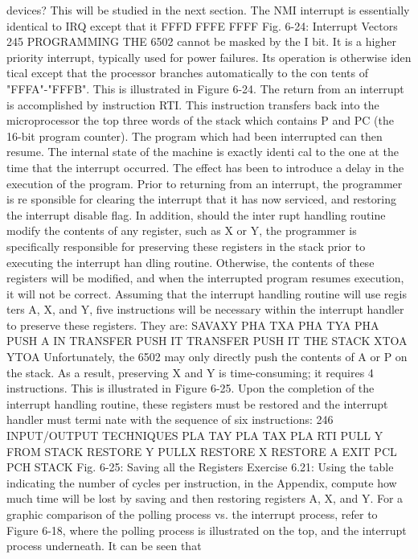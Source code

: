 \documentclass{book}
\begin{document}
devices? This will be studied in the next section.
The NMI interrupt is essentially identical to IRQ except that it
FFFD
FFFE
FFFF
Fig. 6-24: Interrupt Vectors
245
PROGRAMMING THE 6502
cannot be masked by the I bit. It is a higher priority interrupt,
typically used for power failures. Its operation is otherwise iden
tical except that the processor branches automatically to the con
tents of "FFFA"-"FFFB". This is illustrated in Figure 6-24.
The return from an interrupt is accomplished by instruction
RTI. This instruction transfers back into the microprocessor the
top three words of the stack which contains P and PC (the 16-bit
program counter). The program which had been interrupted can
then resume. The internal state of the machine is exactly identi
cal to the one at the time that the interrupt occurred. The effect
has been to introduce a delay in the execution of the program.
Prior to returning from an interrupt, the programmer is re
sponsible for clearing the interrupt that it has now serviced, and
restoring the interrupt disable flag. In addition, should the inter
rupt handling routine modify the contents of any register, such as
X or Y, the programmer is specifically responsible for preserving
these registers in the stack prior to executing the interrupt han
dling routine. Otherwise, the contents of these registers will be
modified, and when the interrupted program resumes execution,
it will not be correct.
Assuming that the interrupt handling routine will use regis
ters A, X, and Y, five instructions will be necessary within the
interrupt handler to preserve these registers. They are:
SAVAXY PHA
TXA
PHA
TYA
PHA
PUSH A IN
TRANSFER
PUSH IT
TRANSFER
PUSH IT
THE STACK
XTOA
YTOA
Unfortunately, the 6502 may only directly push the contents of A or
P on the stack. As a result, preserving X and Y is time-consuming; it
requires 4 instructions. This is illustrated in Figure 6-25.
Upon the completion of the interrupt handling routine, these
registers must be restored and the interrupt handler must termi
nate with the sequence of six instructions:
246
INPUT/OUTPUT TECHNIQUES
PLA
TAY
PLA
TAX
PLA
RTI
PULL Y FROM STACK
RESTORE Y
PULLX
RESTORE X
RESTORE A
EXIT
PCL
PCH
STACK
Fig. 6-25: Saving all the Registers
Exercise 6.21: Using the table indicating the number of cycles
per instruction, in the Appendix, compute how much time will be
lost by saving and then restoring registers A, X, and Y.
For a graphic comparison of the polling process vs. the interrupt
process, refer to Figure 6-18, where the polling process is illustrated
on the top, and the interrupt process underneath. It can be seen that
\end{document}
